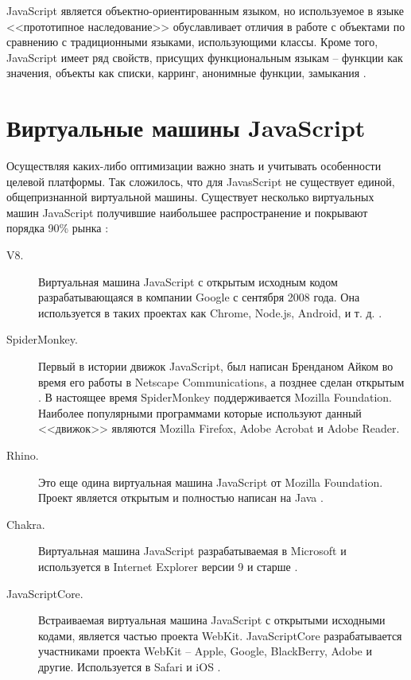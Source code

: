 JavaScript является объектно-ориентированным языком, но используемое в языке <<прототипное наследование>> обуславливает отличия в работе с объектами по сравнению с традиционными языками, использующими классы. Кроме того, JavaScript имеет ряд свойств, присущих функциональным языкам -- функции как значения, объекты как списки, карринг, анонимные функции, замыкания \cite{wiki:JS:ru}.

\section{Виртуальные машины JavaScript}

Осуществляя каких-либо оптимизации важно знать и учитывать особенности целевой платформы. Так сложилось, что для JavasScript не существует единой, общепризнанной виртуальной машины. Существует несколько виртуальных машин JavaScript получившие наибольшее распространение и покрывают порядка 90\% рынка \cite{StatCounter, w3schools}:
\begin{description}
\item[V8.] Виртуальная машина JavaScript с открытым исходным кодом разрабатывающаяся в компании Google с сентября 2008 года. Она используется в таких проектах как Chrome, Node.js, Android, и т. д. \cite{wiki:V8:en, wiki:V8:ru}.

\item[SpiderMonkey.] Первый в истории движок JavaScript, был написан Бренданом Айком во время его работы в Netscape Communications, а позднее сделан открытым \cite{wiki:SpiderMonkey:ru}. В настоящее время SpiderMonkey поддерживается Mozilla Foundation. 
Наиболее популярными программами которые используют данный <<движок>> являются Mozilla Firefox, Adobe Acrobat и Adobe Reader.

\item[Rhino.] Это еще одина виртуальная машина JavaScript от Mozilla Foundation. Проект является открытым и полностью написан на Java \cite{wiki:Rhino:ru}.

\item[Chakra.] Виртуальная машина JavaScript разрабатываемая в Microsoft и используется в Internet Explorer версии 9 и старше \cite{wiki:Chakra:en}.

\item[JavaScriptCore.] Встраиваемая виртуальная машина JavaScript с открытыми исходными кодами, является частью проекта WebKit. JavaScriptCore разрабатывается участниками проекта WebKit -- Apple, Google, BlackBerry, Adobe и другие. Используется в Safari и iOS \cite{JavaScriptCore}.

\end{description}



